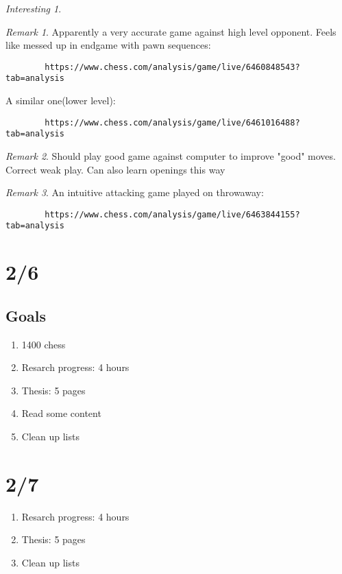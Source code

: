 \documentclass[11pt]{article}
\theoremstyle{remark}
\newtheorem{remark}{Remark}
\newtheorem{interest}{Interesting}
\begin{document}
\begin{interest}
\begin{remark}
	Apparently a very accurate game against high level opponent. Feels like messed up in endgame with pawn sequences:
	\begin{verbatim}
		https://www.chess.com/analysis/game/live/6460848543?tab=analysis
	\end{verbatim}

	A similar one(lower level):
	\begin{verbatim}
		https://www.chess.com/analysis/game/live/6461016488?tab=analysis
	\end{verbatim}
\end{remark}

\begin{remark}
	Should play good game against computer to improve "good" moves. Correct weak play. Can also learn openings this way
\end{remark}

\begin{remark}
	An intuitive attacking game played on throwaway:
	\begin{verbatim}
		https://www.chess.com/analysis/game/live/6463844155?tab=analysis
	\end{verbatim}
\end{remark}

\section{2/6}

\subsection{Goals}

\begin{enumerate}
	\item 1400 chess
	\item Resarch progress: 4 hours
	\item Thesis: 5 pages
	\item Read some content
	\item Clean up lists
\end{enumerate}

\section{2/7}

\begin{enumerate}
	\item Resarch progress: 4 hours
	\item Thesis: 5 pages
	\item Clean up lists
\end{enumerate}


\end{interest}
\end{document}
